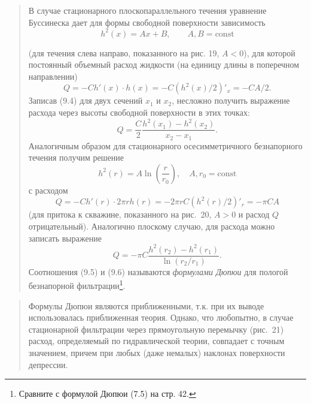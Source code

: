 \documentclass[12pt,a4paper]{article}
\begin{document}
\begin{quote}\sloppy
В случае стационарного плоскопараллельного течения уравнение Буссинеска дает для формы свободной поверхности зависимость
\begin{equation}h^2(x)=Ax+B,\qquad A,B=\mathrm{const}\tag{9.4}\label{q6:eq-9-4}\end{equation}

(для течения слева направо, показанного на рис. 19, $A<0$), для которой постоянный объемный расход жидкости (на единицу длины в поперечном направлении)
\[Q=-Ch'(x)\cdot h(x)=-C(h^2(x)/2)'_x=-CA/2.\]
Записав (9.4) для двух сечений $x_1$ и $x_2$, несложно получить выражение расхода через высоты свободной поверхности в этих точках:
\begin{equation}Q=\frac{C}{2}\frac{h^2(x_1)-h^2(x_2)}{x_2-x_1}.\tag{9.5}\label{q6:eq-9-5}\end{equation}
Аналогичным образом для стационарного осесимметричного безнапорного течения получим решение
\[h^2(r)=A\ln\left(\frac{r}{r_0}\right),\quad A,r_0=\mathrm{const}\]
с расходом
\[Q=-Ch'(r)\cdot2\pi rh(r)=-2\pi rC(h^2(r)/2)'_r=-\pi CA\]
(для притока к скважине, показанного на рис.~20, $A>0$ и расход $Q$ отрицательный). Аналогично плоскому случаю, для расхода можно записать выражение
\begin{equation}Q=-\pi C\frac{h^2(r_2)-h^2(r_1)}{\ln(r_2/r_1)}.\tag{9.6}\label{q6:eq-9-6}\end{equation}
Соотношения (9.5) и (9.6) называются \textit{формулами Дюпюи} для пологой безнапорной фильтрации\setcounter{footnote}{0}\footnote{Сравните с формулой Дюпюи (7.5) на стр. 42.}.
\par\nobreak{}\par
\end{quote}

\begin{quote}\sloppy
Формулы Дюпюи являются приближенными, т.к. при их выводе использовалась приближенная теория. Однако, что любопытно, в случае стационарной фильтрации через прямоугольную перемычку (рис.~21) расход, определяемый по гидравлической теории, совпадает с точным значением, причем при любых (даже немалых) наклонах поверхности депрессии.

\par\nobreak{}\par
\end{quote}
\end{document}
